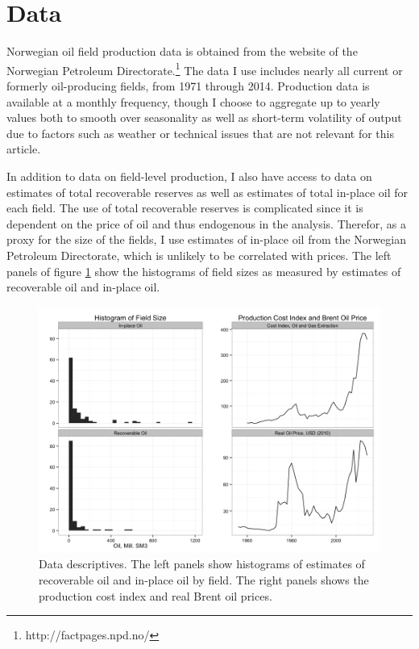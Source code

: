 \documentclass[11pt]{article}
\begin{document}
\section{Data}
Norwegian oil field production data is obtained from the website of the Norwegian Petroleum Directorate.\footnote{http://factpages.npd.no/} The data I use includes nearly all current or formerly oil-producing fields, from 1971 through 2014. Production data is available at a monthly frequency, though I choose to aggregate up to yearly values both to smooth over seasonality as well as short-term volatility of output due to factors such as weather or technical issues that are not relevant for this article. 

In addition to data on field-level production, I also have access to data on estimates of total recoverable reserves as well as estimates of total in-place oil for each field. The use of total recoverable reserves is complicated since it is dependent on the price of oil and thus endogenous in the analysis.  Therefor, as a proxy for the size of the fields, I use estimates of in-place oil from the Norwegian Petroleum Directorate, which is unlikely to be correlated with prices. The left panels of figure \ref{data_descriptives} show the histograms of field sizes as measured by estimates of recoverable oil and in-place oil. 

\begin{figure}
	\includegraphics[width=1\textwidth]{figures/data_descriptives.png}
	\caption{Data descriptives. The left panels show histograms of estimates of recoverable oil and in-place oil by field. The right panels shows the production cost index and real Brent oil prices.}
	\label{data_descriptives}
\end{figure}
\end{document}
